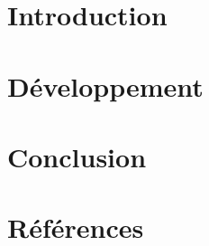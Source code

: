 \documentclass[canadien, 12pt]{article}
\begin{document}



\newpage


\tableofcontents
\newpage

\listoffigures
\listoftables
\newpage


\section{Introduction}


\section{Développement}


\section{Conclusion}


\section{Références}
{}

\end{document}
